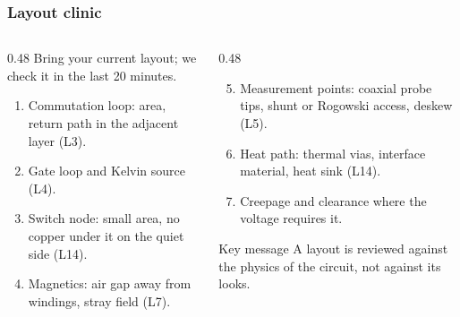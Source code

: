 \begin{frame}
	\frametitle{Layout clinic}
	\begin{columns}[T]
		\begin{column}{0.48\textwidth}
			\small
			Bring your current layout; we check it in the last 20 minutes.
			\begin{enumerate}
				\item Commutation loop: area, return path in the adjacent layer (L3).
				\item Gate loop and Kelvin source (L4).
				\item Switch node: small area, no copper under it on the quiet side (L14).
				\item Magnetics: air gap away from windings, stray field (L7).
			\end{enumerate}
		\end{column}
		\begin{column}{0.48\textwidth}
			\small
			\begin{enumerate}
				\setcounter{enumi}{4}
				\item Measurement points: coaxial probe tips, shunt or Rogowski access, deskew (L5).
				\item Heat path: thermal vias, interface material, heat sink (L14).
				\item Creepage and clearance where the voltage requires it.
			\end{enumerate}
			\begin{block}{Key message}
				A layout is reviewed against the physics of the circuit, not against its looks.
			\end{block}
		\end{column}
	\end{columns}
\end{frame}

